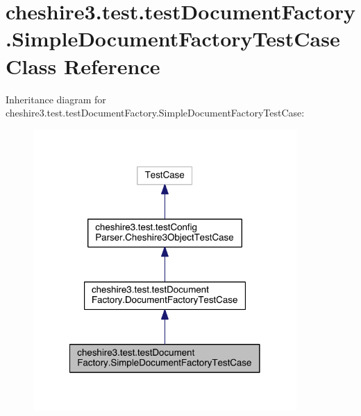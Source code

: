 \hypertarget{classcheshire3_1_1test_1_1test_document_factory_1_1_simple_document_factory_test_case}{\section{cheshire3.\-test.\-test\-Document\-Factory.\-Simple\-Document\-Factory\-Test\-Case Class Reference}
\label{classcheshire3_1_1test_1_1test_document_factory_1_1_simple_document_factory_test_case}
}


Inheritance diagram for cheshire3.\-test.\-test\-Document\-Factory.\-Simple\-Document\-Factory\-Test\-Case\-:
\nopagebreak
\begin{figure}[H]
\begin{center}
\leavevmode
\includegraphics[width=284pt]{classcheshire3_1_1test_1_1test_document_factory_1_1_simple_document_factory_test_case__inherit__graph}
\end{center}
\end{figure}


